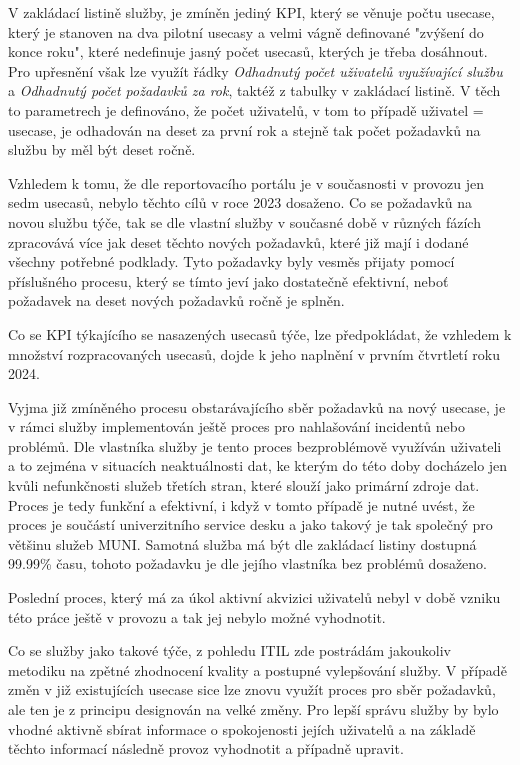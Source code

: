 \documentclass[
  digital,     %
  twoside,     %
  lof,         %
  lot,         %
]{fithesis4}
\begin{document}
V zakládací listině služby, je zmíněn jediný KPI, který se věnuje počtu usecase, který je stanoven na dva pilotní usecasy a velmi vágně definované "zvýšení do konce roku", které nedefinuje jasný počet usecasů, kterých je třeba dosáhnout. Pro upřesnění však lze využít řádky \emph{Odhadnutý počet uživatelů využívající službu} a \emph{Odhadnutý počet požadavků za rok}, taktéž z tabulky v zakládací listině. V těch to parametrech je definováno, že počet uživatelů, v tom to případě uživatel = usecase, je odhadován na deset za první rok a stejně tak počet požadavků na službu by měl být deset ročně. 

Vzhledem k tomu, že dle reportovacího portálu je v současnosti v provozu jen sedm usecasů, nebylo těchto cílů v roce 2023 dosaženo. Co se požadavků na novou službu týče, tak se dle vlastní služby v současné době v různých fázích zpracovává více jak deset těchto nových požadavků, které již mají i dodané všechny potřebné podklady. Tyto požadavky byly vesměs přijaty pomocí příslušného procesu, který se tímto jeví jako dostatečně efektivní, neboť požadavek na deset nových požadavků ročně je splněn. 

Co se KPI týkajícího se nasazených usecasů týče, lze předpokládat, že vzhledem k množství rozpracovaných usecasů, dojde k jeho naplnění v prvním čtvrtletí roku 2024.

Vyjma již zmíněného procesu obstarávajícího sběr požadavků na nový usecase, je v rámci služby implementován ještě proces pro nahlašování incidentů nebo problémů. Dle vlastníka služby je tento proces bezproblémově využíván uživateli a to zejména v situacích neaktuálnosti dat, ke kterým do této doby docházelo jen kvůli nefunkčnosti služeb třetích stran, které slouží jako primární zdroje dat. Proces je tedy funkční a efektivní, i když v tomto případě je nutné uvést, že proces je součástí univerzitního service desku a jako takový je tak společný pro většinu služeb MUNI. Samotná služba má být dle zakládací listiny dostupná 99.99\% času, tohoto požadavku je dle jejího vlastníka bez problémů dosaženo.

Poslední proces, který má za úkol aktivní akvizici uživatelů nebyl v době vzniku této práce ještě v provozu a tak jej nebylo možné vyhodnotit. 

Co se služby jako takové týče, z pohledu ITIL zde postrádám jakoukoliv metodiku na zpětné zhodnocení kvality a postupné vylepšování služby. V případě změn v již existujících usecase sice lze znovu využít proces pro sběr požadavků, ale ten je z principu designován na velké změny. Pro lepší správu služby by bylo vhodné aktivně sbírat informace o spokojenosti jejích uživatelů a na základě těchto informací následně provoz vyhodnotit a případně upravit. 
\end{document}
